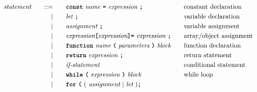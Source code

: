 \begin{alignat*}{9}
&& \textit{statement}    &&\quad ::= &\quad && \textbf{\texttt{const}}\  \textit{name} \ 
                                           \textbf{\texttt{=}}\  \textit{expression} \ \textbf{\texttt{;}}
                                                           && \textrm{constant declaration} \\
&&                       && |   &\quad && \textit{let} \ \textbf{\texttt{;}}
                                                           && \textrm{variable declaration} \\
&&                       && |   &\quad && \textit{assignment} \ \textbf{\texttt{;}}
                                                           && \textrm{variable assignment} \\
&&                       && |   &\quad && \textit{expression} \textbf{\texttt{[}}
                                          \textit{expression} \textbf{\texttt{]}}
                                           \textbf{\texttt{=}}\  \textit{expression} \ \textbf{\texttt{;}}
                                                           && \textrm{array/object assignment} \\
&&                       && |   &\quad && \textbf{\texttt{function}}\  \textit{name} \ 
                                   \textbf{\texttt{(}}\  \textit{parameters} \ \textbf{\texttt{)}}\ \textit{block} \quad
                                                           && \textrm{function declaration}\\
&&                       && |   &\quad && \textbf{\texttt{return}}\  \textit{expression} \ \textbf{\texttt{;}}
                                                           && \textrm{return statement}\\
&&                       && |   &\quad && \textit{if-statement} \quad
                                                           && \textrm{conditional statement}\\
&&                       && |   &\quad && \textbf{\texttt{while}}\  
                                   \textbf{\texttt{(}}\  \textit{expression} \ \textbf{\texttt{)}} \
                                   \textit{block}
                                                           && \textrm{while loop}\\
&&                       && |   &\quad && \textbf{\texttt{for}}\ \textbf{\texttt{(}} \ 
                                          (\ \textit{assignment} \ | \  \textit{let}\ ) \textbf{\texttt{;}} \\

\end{alignat*}
